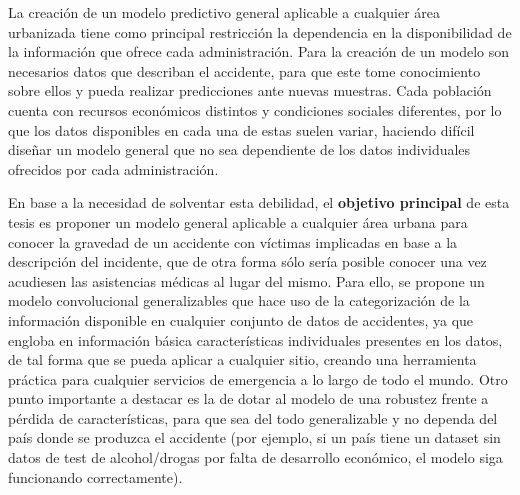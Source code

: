 
La creación de un modelo predictivo general aplicable a cualquier área urbanizada tiene como principal restricción la dependencia en la disponibilidad de la información que ofrece cada administración. Para la creación de un modelo son necesarios datos que describan el accidente, para que este tome conocimiento sobre ellos y pueda realizar predicciones ante nuevas muestras. Cada población cuenta con recursos económicos distintos y condiciones sociales diferentes, por lo que los datos disponibles en cada una de estas suelen variar, haciendo difícil diseñar un modelo general que no sea dependiente de los datos individuales ofrecidos por cada administración.

En base a la necesidad de solventar esta debilidad, el \textbf{objetivo principal} de esta tesis es proponer un modelo general aplicable a cualquier área urbana para conocer la gravedad de un accidente con víctimas implicadas en base a la descripción del incidente, que de otra forma sólo sería posible conocer una vez acudiesen las asistencias médicas al lugar del mismo. Para ello, se propone un modelo convolucional generalizables que hace uso de la categorización de la información disponible en cualquier conjunto de datos de accidentes, ya que engloba en información básica características individuales presentes en los datos, de tal forma que se pueda aplicar a cualquier sitio, creando una herramienta práctica para cualquier servicios de emergencia a lo largo de todo el mundo.
Otro punto importante a destacar es la de dotar al modelo de una robustez frente a pérdida de características, para que sea del todo generalizable y no dependa del país donde se produzca el accidente (por ejemplo, si un país tiene un dataset sin datos de test de alcohol/drogas por falta de desarrollo económico, el modelo siga funcionando correctamente).





